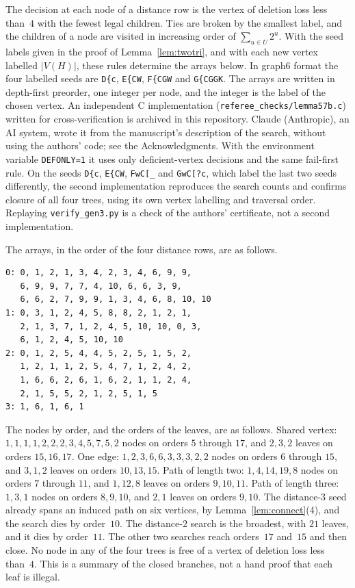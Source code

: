 \documentclass[ASNA]{USG}
\theoremstyle{WBstyletwo}
\numberwithin{equation}{section}
\begin{document}
The decision at each node of a distance row is the vertex of deletion loss less than~$4$ with the fewest legal children. Ties are broken by the smallest label, and the children of a node are visited in increasing order of $\sum_{u\in U}2^u$. With the seed labels given in the proof of Lemma~\ref{lem:twotri}, and with each new vertex labelled $|V(H)|$, these rules determine the arrays below. In graph6 format the four labelled seeds are \texttt{D\{c}, \texttt{E\{CW}, \texttt{F\{CGW} and \texttt{G\{CGGK}. The arrays are written in depth-first preorder, one integer per node, and the integer is the label of the chosen vertex. An independent C implementation (\texttt{referee\_checks/lemma57b.c}) written for cross-verification is archived in this repository. Claude (Anthropic), an AI system, wrote it from the manuscript's description of the search, without using the authors' code; see the Acknowledgments. With the environment variable \texttt{DEFONLY=1} it uses only deficient-vertex decisions and the same fail-first rule. On the seeds \texttt{D\{c}, \texttt{E\{CW}, \texttt{FwC[\_} and \texttt{GwC[?c}, which label the last two seeds differently, the second implementation reproduces the search counts and confirms closure of all four trees, using its own vertex labelling and traversal order. Replaying \texttt{verify\_gen3.py} is a check of the authors' certificate, not a second implementation.

The arrays, in the order of the four distance rows, are as follows.
\begin{verbatim}
0: 0, 1, 2, 1, 3, 4, 2, 3, 4, 6, 9, 9,
   6, 9, 9, 7, 7, 4, 10, 6, 6, 3, 9,
   6, 6, 2, 7, 9, 9, 1, 3, 4, 6, 8, 10, 10
1: 0, 3, 1, 2, 4, 5, 8, 8, 2, 1, 2, 1,
   2, 1, 3, 7, 1, 2, 4, 5, 10, 10, 0, 3,
   6, 1, 2, 4, 5, 10, 10
2: 0, 1, 2, 5, 4, 4, 5, 2, 5, 1, 5, 2,
   1, 2, 1, 1, 2, 5, 4, 7, 1, 2, 4, 2,
   1, 6, 6, 2, 6, 1, 6, 2, 1, 1, 2, 4,
   2, 1, 5, 5, 2, 1, 2, 5, 1, 5
3: 1, 6, 1, 6, 1
\end{verbatim}
The nodes by order, and the orders of the leaves, are as follows. Shared vertex: $1,1,1,1,2,2,2,3,4,5,7,5,2$ nodes on orders $5$ through $17$, and $2,3,2$ leaves on orders $15,16,17$. One edge: $1,2,3,6,6,3,3,3,2,2$ nodes on orders $6$ through $15$, and $3,1,2$ leaves on orders $10,13,15$. Path of length two: $1,4,14,19,8$ nodes on orders $7$ through $11$, and $1,12,8$ leaves on orders $9,10,11$. Path of length three: $1,3,1$ nodes on orders $8,9,10$, and $2,1$ leaves on orders $9,10$.
The distance-$3$ seed already spans an induced path on six vertices, by Lemma~\ref{lem:connect}(4), and the search dies by order~$10$. The distance-$2$ search is the broadest, with $21$ leaves, and it dies by order~$11$. The other two searches reach orders~$17$ and~$15$ and then close. No node in any of the four trees is free of a vertex of deletion loss less than~$4$. This is a summary of the closed branches, not a hand proof that each leaf is illegal.
\end{document}

